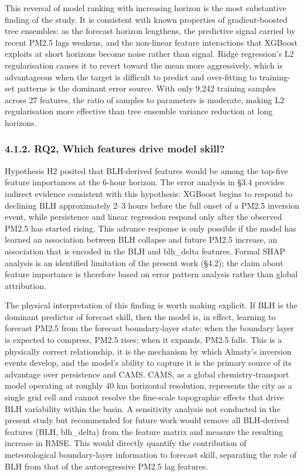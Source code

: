This reversal of model ranking with increasing horizon is the most substantive finding of the study. It is consistent with known properties of gradient-boosted tree ensembles: as the forecast horizon lengthens, the predictive signal carried by recent PM2.5 lags weakens, and the non-linear feature interactions that XGBoost exploits at short horizons become noise rather than signal. Ridge regression's L2 regularisation causes it to revert toward the mean more aggressively, which is advantageous when the target is difficult to predict and over-fitting to training-set patterns is the dominant error source. With only 9,242 training samples across 27 features, the ratio of samples to parameters is moderate, making L2 regularisation more effective than tree ensemble variance reduction at long horizons.

\subsubsection{4.1.2. RQ2, Which features drive model skill?}\label{rq2-which-features-drive-model-skill}

Hypothesis H2 posited that BLH-derived features would be among the top-five feature importances at the 6-hour horizon. The error analysis in §3.4 provides indirect evidence consistent with this hypothesis: XGBoost begins to respond to declining BLH approximately 2--3 hours before the full onset of a PM2.5 inversion event, while persistence and linear regression respond only after the observed PM2.5 has started rising. This advance response is only possible if the model has learned an association between BLH collapse and future PM2.5 increase, an association that is encoded in the BLH and blh\_delta features. Formal SHAP analysis is an identified limitation of the present work (§4.2); the claim about feature importance is therefore based on error pattern analysis rather than global attribution.

The physical interpretation of this finding is worth making explicit. If BLH is the dominant predictor of forecast skill, then the model is, in effect, learning to forecast PM2.5 from the forecast boundary-layer state: when the boundary layer is expected to compress, PM2.5 rises; when it expands, PM2.5 falls. This is a physically correct relationship, it is the mechanism by which Almaty's inversion events develop, and the model's ability to capture it is the primary source of its advantage over persistence and CAMS. CAMS, as a global chemistry-transport model operating at roughly 40 km horizontal resolution, represents the city as a single grid cell and cannot resolve the fine-scale topographic effects that drive BLH variability within the basin. A sensitivity analysis not conducted in the present study but recommended for future work would remove all BLH-derived features (BLH, blh\_delta) from the feature matrix and measure the resulting increase in RMSE. This would directly quantify the contribution of meteorological boundary-layer information to forecast skill, separating the role of BLH from that of the autoregressive PM2.5 lag features.

